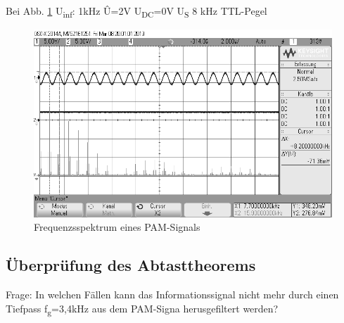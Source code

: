 \documentclass[12pt,a4paper]{scrartcl}
\begin{document}
  
  Bei Abb. \ref{fig:scope_10} U\textsubscript{inf}:  1kHz \^{U}=2V
        U\textsubscript{DC}=0V
        U\textsubscript{S} 8 kHz TTL-Pegel
        
  \begin{figure}[htbp]
    \begin{minipage}{0.72\textwidth}
     \centering
      \includegraphics[width=1\textwidth]{scope_10}
      \caption{Frequenzsspektrum eines PAM-Signals}
      \label{fig:scope_10}
    \end{minipage}\hfill
  \end{figure} 
  \newpage
       
       
    \subsection{Überprüfung des Abtasttheorems}
    \label{sub-sec-abtasttheorem}
    Frage: 
    In welchen Fällen kann das Informationssignal nicht mehr durch einen Tiefpass f\textsubscript{g}=3,4kHz aus dem PAM-Signa herusgefiltert werden?
    
\end{document}
